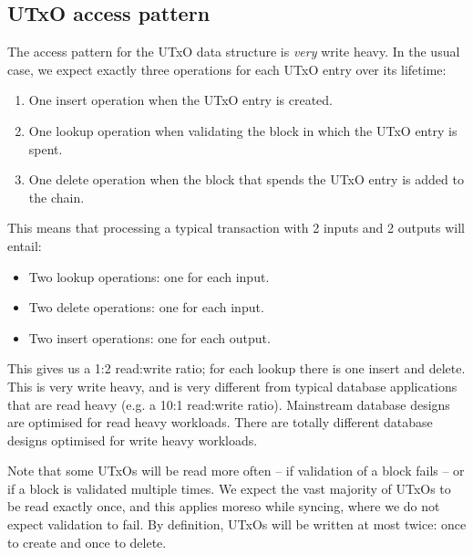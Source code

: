 \documentclass[11pt,a4paper]{article}
\begin{document}
\subsection{UTxO access pattern}
\label{workload}

The access pattern for the UTxO data structure is \emph{very} write heavy. In
the usual case, we expect exactly three operations for each UTxO entry over its
lifetime:
\begin{enumerate}
\item One {\sc insert} operation when the UTxO entry is created.
\item One {\sc lookup} operation when validating the block in which the UTxO
      entry is spent.
\item One {\sc delete} operation when the block that spends the UTxO entry is
      added to the chain.
\end{enumerate}
This means that processing a typical transaction with 2 inputs and 2 outputs
will entail:
\begin{itemize}
\setlength{\itemsep}{0pt}%
\setlength{\parskip}{1pt}%
\item Two {\sc lookup} operations: one for each input.
\item Two {\sc delete} operations: one for each input.
\item Two {\sc insert} operations: one for each output.
\end{itemize}
This gives us a 1:2 read:write ratio; for each {\sc lookup} there is one
{\sc insert} and {\sc delete}. This is very write heavy, and is very different
from typical database applications that are read heavy (e.g. a 10:1 read:write
ratio). Mainstream database designs are optimised for read heavy workloads.
There are totally different database designs optimised for write heavy
workloads.

Note that some UTxOs will be read more often -- if validation of a block fails
-- or if a block is validated multiple times. We expect the vast majority of
UTxOs to be read exactly once, and this applies moreso while syncing, where we
do not expect validation to fail. By definition, UTxOs will be written at most
twice: once to create and once to delete.
\end{document}
